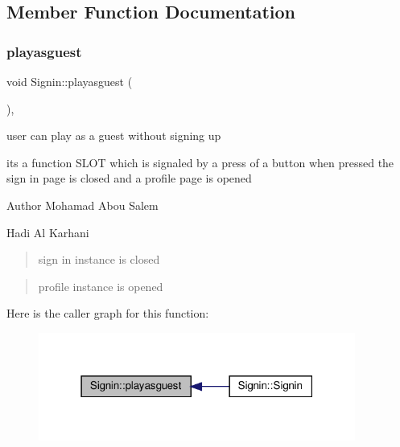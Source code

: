 \subsection{Member Function Documentation}
\mbox{\label{classSignin_afabfdc04cfc9589c8dabe9b649e41112}} 
\subsubsection{\texorpdfstring{playasguest}{playasguest}}
{\footnotesize\ttfamily void Signin\+::playasguest (\begin{DoxyParamCaption}{ }\end{DoxyParamCaption})\hspace{0.3cm}{\ttfamily [private]}, {\ttfamily [slot]}}



user can play as a guest without signing up 

its a function S\+L\+OT which is signaled by a press of a button when pressed the sign in page is closed and a profile page is opened

\begin{DoxyAuthor}{Author}
Mohamad Abou Salem 

Hadi Al Karhani 
\end{DoxyAuthor}
\begin{quote}
sign in instance is closed \end{quote}


\begin{quote}
profile instance is opened \end{quote}
Here is the caller graph for this function\+:
\nopagebreak
\begin{figure}[H]
\begin{center}
\leavevmode
\includegraphics[width=295pt]{classSignin_afabfdc04cfc9589c8dabe9b649e41112_icgraph}
\end{center}
\end{figure}
\mbox{\label{classSignin_a0a6afd65a4526eec5cbc68e84ba35852}} 
